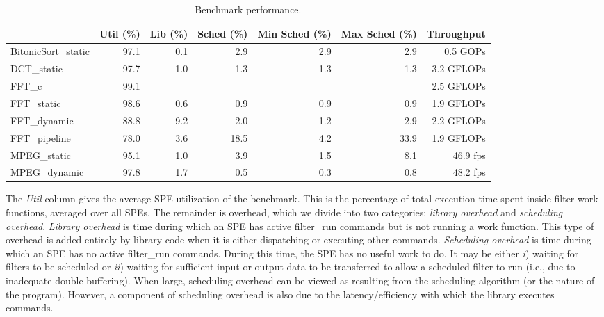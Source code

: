 \begin{table*}[!tb]
\begin{center}
\begin{tabular}{|l|r|r|r|r|r|r|}
\hline
                             & Util (\%) & Lib (\%) & Sched (\%) & Min Sched (\%) & Max Sched (\%) & Throughput \\
\hline
\textsf{BitonicSort\_static} & 97.1 & 0.1 &   2.9 &       2.9 &       2.9 &        0.5 GOPs \\
\hline
\textsf{DCT\_static}         & 97.7 & 1.0 &   1.3 &       1.3 &       1.3 &        3.2 GFLOPs \\
\hline
\textsf{FFT\_c}              & 99.1 &     &       &           &           &        2.5 GFLOPs \\
\textsf{FFT\_static}         & 98.6 & 0.6 &   0.9 &       0.9 &       0.9 &        1.9 GFLOPs \\
\textsf{FFT\_dynamic}        & 88.8 & 9.2 &   2.0 &       1.2 &       2.9 &        2.2 GFLOPs \\
\textsf{FFT\_pipeline}       & 78.0 & 3.6 &  18.5 &       4.2 &      33.9 &        1.9 GFLOPs \\
\hline
\textsf{MPEG\_static}        & 95.1 & 1.0 &   3.9 &       1.5 &       8.1 &       46.9 fps \\
\textsf{MPEG\_dynamic}       & 97.8 & 1.7 &   0.5 &       0.3 &       0.8 &       48.2 fps \\
\hline
\end{tabular}
\end{center}
\label{fig:perf:stats}
\caption{Benchmark performance.}
\end{table*}

The \emph{Util} column gives the average SPE utilization of the
benchmark. This is the percentage of total execution time spent inside filter work functions,
averaged over all SPEs. The remainder is overhead, which we divide into two categories:
\emph{library overhead} and \emph{scheduling overhead}. \emph{Library overhead}
is time during which an SPE has active \textsf{filter\_run} commands but is not
running a work function. This type of overhead is added entirely by library code
when it is either dispatching or executing other commands.
\emph{Scheduling overhead} is time during which an SPE has no active
\textsf{filter\_run} commands. During this time, the SPE has no useful work to do.
It may be either \emph{i}) waiting for filters to be scheduled or \emph{ii})
waiting for sufficient input or output data to be transferred to allow a scheduled filter to run
(i.e., due to inadequate double-buffering).
When large, scheduling overhead can be viewed as resulting from the scheduling algorithm
(or the nature of the program). However, a component of scheduling overhead is also
due to the latency/efficiency with which the library executes commands.

